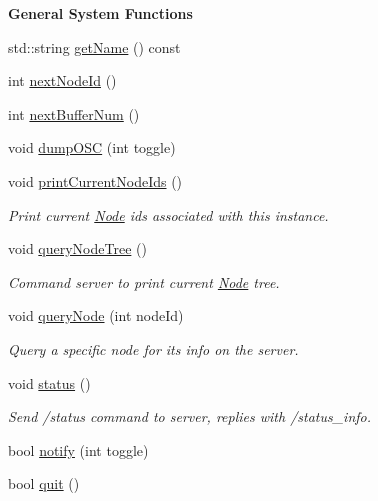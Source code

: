 \begin{Indent}{\bf General System Functions}\par
\begin{DoxyCompactItemize}
\item 
std\-::string \hyperlink{classsc_1_1SCServer_a663f38241749842d676f29463edb9c22}{get\-Name} () const 
\item 
int \hyperlink{classsc_1_1SCServer_ad1194f90f47d7ce50390953bd785b75b}{next\-Node\-Id} ()
\item 
int \hyperlink{classsc_1_1SCServer_aec43a53cc18c49dae4066b4bf85e2067}{next\-Buffer\-Num} ()
\item 
void \hyperlink{classsc_1_1SCServer_ada96ef4c5ea8747899a6db947ec33363}{dump\-O\-S\-C} (int toggle)
\item 
\hypertarget{classsc_1_1SCServer_ac884ae7c3f2791f6b959818c8c2fbe10}{void \hyperlink{classsc_1_1SCServer_ac884ae7c3f2791f6b959818c8c2fbe10}{print\-Current\-Node\-Ids} ()}\label{classsc_1_1SCServer_ac884ae7c3f2791f6b959818c8c2fbe10}

\begin{DoxyCompactList}\small\item\em Print current \hyperlink{classsc_1_1Node}{Node} ids associated with this instance. \end{DoxyCompactList}\item 
\hypertarget{classsc_1_1SCServer_ad057f9ca7dab818c259f95f41e3a575e}{void \hyperlink{classsc_1_1SCServer_ad057f9ca7dab818c259f95f41e3a575e}{query\-Node\-Tree} ()}\label{classsc_1_1SCServer_ad057f9ca7dab818c259f95f41e3a575e}

\begin{DoxyCompactList}\small\item\em Command server to print current \hyperlink{classsc_1_1Node}{Node} tree. \end{DoxyCompactList}\item 
\hypertarget{classsc_1_1SCServer_a775f079ad6a09282356ae161b186e345}{void \hyperlink{classsc_1_1SCServer_a775f079ad6a09282356ae161b186e345}{query\-Node} (int node\-Id)}\label{classsc_1_1SCServer_a775f079ad6a09282356ae161b186e345}

\begin{DoxyCompactList}\small\item\em Query a specific node for its info on the server. \end{DoxyCompactList}\item 
\hypertarget{classsc_1_1SCServer_a9418167a772b6f0f4495c262938277b9}{void \hyperlink{classsc_1_1SCServer_a9418167a772b6f0f4495c262938277b9}{status} ()}\label{classsc_1_1SCServer_a9418167a772b6f0f4495c262938277b9}

\begin{DoxyCompactList}\small\item\em Send /status command to server, replies with /status\-\_\-info. \end{DoxyCompactList}\item 
bool \hyperlink{classsc_1_1SCServer_ac8d0c043f3e055778304fd1d34cf75dc}{notify} (int toggle)
\item 
bool \hyperlink{classsc_1_1SCServer_a6ae0d1f3acafa5c3421725426d0beb96}{quit} ()
\end{DoxyCompactItemize}
\end{Indent}
